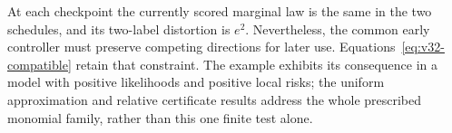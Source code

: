 At each checkpoint the currently scored marginal law is the same in the
two schedules, and its two-label distortion is $e^2$. Nevertheless, the
common early controller must preserve competing directions for later
use. Equations~\eqref{eq:v32-compatible} retain that constraint. The
example exhibits its consequence in a model with positive likelihoods and
positive local risks; the uniform approximation and relative certificate
results address the whole prescribed monomial family, rather than this
one finite test alone.
